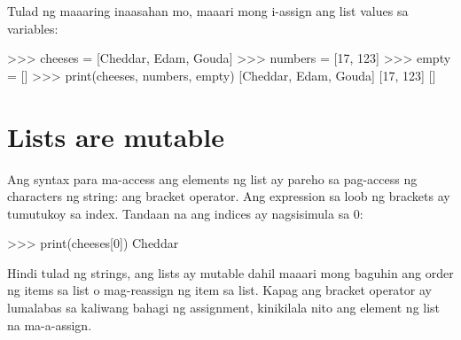 \documentclass[10pt,]{book}
\newenvironment{Shaded}{}{}
\newcommand{\BuiltInTok}[1]{\textcolor[rgb]{0.00,0.50,0.00}{#1}}
\newcommand{\DecValTok}[1]{\textcolor[rgb]{0.25,0.63,0.44}{#1}}
\newcommand{\NormalTok}[1]{#1}
\newcommand{\OperatorTok}[1]{\textcolor[rgb]{0.40,0.40,0.40}{#1}}
\newcommand{\StringTok}[1]{\textcolor[rgb]{0.25,0.44,0.63}{#1}}
\begin{document}
Tulad ng maaaring inaasahan mo, maaari mong i-assign ang list values sa
variables:

\begin{Shaded}
\begin{Highlighting}[]
\OperatorTok{\textgreater{}\textgreater{}\textgreater{}}\NormalTok{ cheeses }\OperatorTok{=}\NormalTok{ [}\StringTok{\textquotesingle{}Cheddar\textquotesingle{}}\NormalTok{, }\StringTok{\textquotesingle{}Edam\textquotesingle{}}\NormalTok{, }\StringTok{\textquotesingle{}Gouda\textquotesingle{}}\NormalTok{]}
\OperatorTok{\textgreater{}\textgreater{}\textgreater{}}\NormalTok{ numbers }\OperatorTok{=}\NormalTok{ [}\DecValTok{17}\NormalTok{, }\DecValTok{123}\NormalTok{]}
\OperatorTok{\textgreater{}\textgreater{}\textgreater{}}\NormalTok{ empty }\OperatorTok{=}\NormalTok{ []}
\OperatorTok{\textgreater{}\textgreater{}\textgreater{}} \BuiltInTok{print}\NormalTok{(cheeses, numbers, empty)}
\NormalTok{[}\StringTok{\textquotesingle{}Cheddar\textquotesingle{}}\NormalTok{, }\StringTok{\textquotesingle{}Edam\textquotesingle{}}\NormalTok{, }\StringTok{\textquotesingle{}Gouda\textquotesingle{}}\NormalTok{] [}\DecValTok{17}\NormalTok{, }\DecValTok{123}\NormalTok{] []}
\end{Highlighting}
\end{Shaded}


\section{Lists are mutable}\label{lists-are-mutable}

   \index{}
 

Ang syntax para ma-access ang elements ng list ay pareho sa pag-access
ng characters ng string: ang bracket operator. Ang expression sa loob ng
brackets ay tumutukoy sa index. Tandaan na ang indices ay nagsisimula sa
0:

\begin{Shaded}
\begin{Highlighting}[]
\OperatorTok{\textgreater{}\textgreater{}\textgreater{}} \BuiltInTok{print}\NormalTok{(cheeses[}\DecValTok{0}\NormalTok{])}
\NormalTok{Cheddar}
\end{Highlighting}
\end{Shaded}

Hindi tulad ng strings, ang lists ay mutable dahil maaari mong baguhin
ang order ng items sa list o mag-reassign ng item sa list. Kapag ang
bracket operator ay lumalabas sa kaliwang bahagi ng assignment,
kinikilala nito ang element ng list na ma-a-assign.
\end{document}
